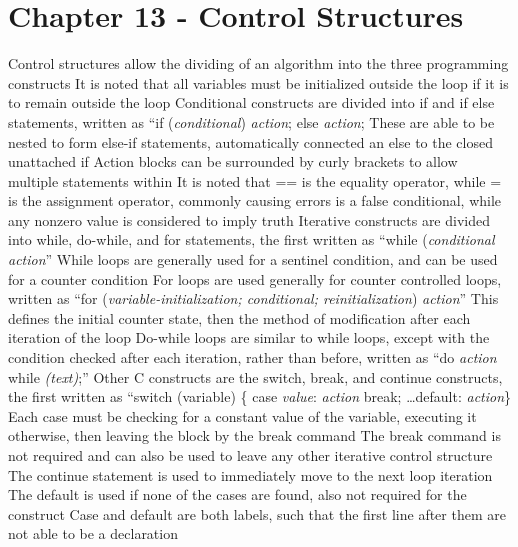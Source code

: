 \documentclass[11 pt, twoside]{article}
\newenvironment{outline*}
{
	\begin{outline}[enumerate]
	}
	{\end{outline}
}
\begin{document}
\section{Chapter 13 - Control Structures}
\begin{outline*}
\1 Control structures allow the dividing of an algorithm into the three programming constructs
\2 It is noted that all variables must be initialized outside the loop if it is to remain outside the loop
\1 Conditional constructs are divided into if and if else statements, written as ``if (\textit{conditional}) \textit{action}; else \textit{action};
\2 These are able to be nested to form else-if statements, automatically connected an else to the closed unattached if
\2 Action blocks can be surrounded by curly brackets to allow multiple statements within
\2 It is noted that == is the equality operator, while = is the assignment operator, commonly causing errors
 is a false conditional, while any nonzero value is considered to imply truth
\1 Iterative constructs are divided into while, do-while, and for statements, the first written as ``while (\textit{conditional} \textit{action}''
\2 While loops are generally used for a sentinel condition, and can be used for a counter condition
\2 For loops are used generally for counter controlled loops, written as ``for (\textit{variable-initialization; conditional; reinitialization}) \textit{action}''
\3 This defines the initial counter state, then the method of modification after each iteration of the loop
\2 Do-while loops are similar to while loops, except with the condition checked after each iteration, rather than before, written as ``do \textit{action} while \textit{(text)};''
\1 Other C constructs are the switch, break, and continue constructs, the first written as ``switch (variable) \{ case \textit{value}: \textit{action} break; \dots default: \textit{action}\}
\2 Each case must be checking for a constant value of the variable, executing it otherwise, then leaving the block by the break command
\2 The break command is not required and can also be used to leave any other iterative control structure
\3 The continue statement is used to immediately move to the next loop iteration
\2 The default is used if none of the cases are found, also not required for the construct
\2 Case and default are both labels, such that the first line after them are not able to be a declaration
\end{outline*}
\end{document}

